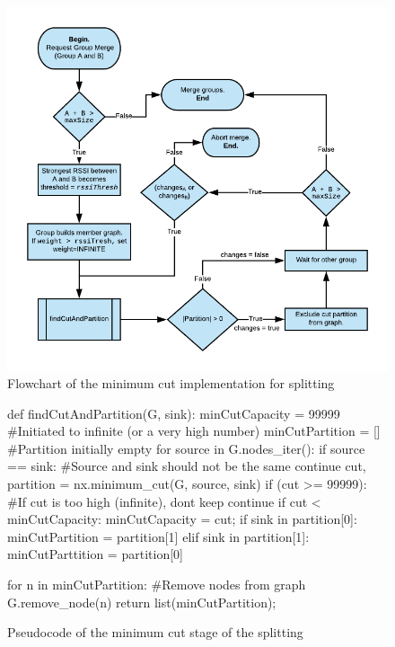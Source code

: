 \begin{figure}
	\includegraphics[width=\textwidth]{Images/mincutflow2.png}
		\caption{Flowchart of the minimum cut implementation for splitting}%
		\label{fig:mincutflow}%
\end{figure}


	\begin{figure}
		\tiny
		\begin{python}
			def findCutAndPartition(G, sink):
			minCutCapacity = 99999 #Initiated to infinite (or a very high number)
			minCutPartition = [] #Partition initially empty
			for source in G.nodes_iter():
				if source == sink: #Source and sink should not be the same
						continue
				cut, partition = nx.minimum_cut(G, source, sink)
				if (cut >= 99999): #If cut is too high (infinite), dont keep
						continue
				if cut < minCutCapacity:
						minCutCapacity = cut;
						if sink in partition[0]:
								minCutPartition = partition[1]
						elif sink in partition[1]:
								minCutParttition = partition[0]

			for n in minCutPartition: #Remove nodes from graph
						G.remove_node(n)
			return list(minCutPartition);
		\end{python}
		\caption{Pseudocode of the minimum cut stage of the splitting}
		\label{fig:pseudocut}
	\end{figure}


